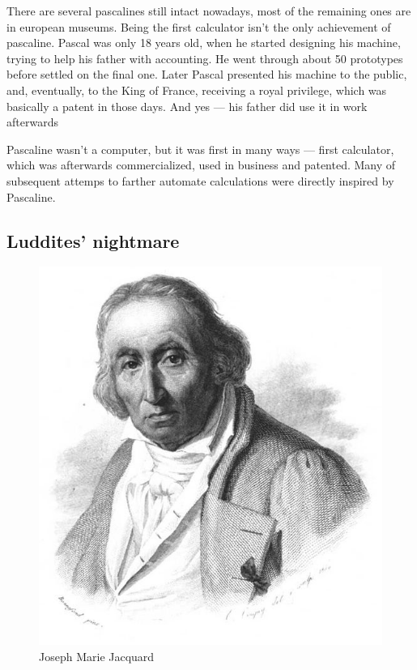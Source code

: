 \documentclass{report}
\begin{document}
            There are several pascalines still intact nowadays, most of the remaining ones are in european museums. Being the first calculator isn't the only achievement
            of pascaline. Pascal was only 18 years old, when he started designing his machine, trying to help his father with accounting. He went through about 50 prototypes
            before settled on the final one. Later Pascal presented his machine to the public, and, eventually, to the King of France, receiving a royal privilege, which 
            was basically a patent in those days. And yes --- his father did use it in work afterwards \par


            Pascaline wasn't a computer, but it was first in many ways --- first calculator, which was afterwards commercialized, used in business and patented. Many of 
            subsequent attemps to farther automate calculations were directly inspired by Pascaline. \par

            \subsection{Luddites' nightmare}

            \begin{figure}
                \centering
                \includegraphics[scale=0.2]{images/persons/person_joseph_jacquard.jpg}
                \caption{Joseph Marie Jacquard}
            \end{figure}
            
\end{document}
